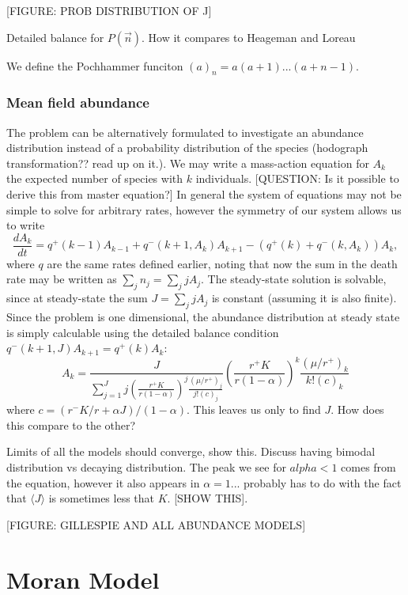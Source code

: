 \documentclass[11pt,a4paper,final]{iopart}
\begin{document}
[FIGURE: PROB DISTRIBUTION OF J]

Detailed balance for $P(\vec{n})$.
How it compares to Heageman and Loreau ~\cite{ref7}

We define the Pochhammer funciton $(a)_n=a(a+1)...(a+n-1)$.

\subsubsection{Mean field abundance}
The problem can be alternatively formulated to investigate an abundance distribution instead of a probability distribution of the species (hodograph transformation?? read up on it.).
We may write a mass-action equation for $A_k$ the expected number of species with $k$ individuals.
[QUESTION: Is it possible to derive this from master equation?]
In general the system of equations may not be simple to solve for arbitrary rates, however the symmetry of our system allows us to write
\begin{equation}
\frac{dA_k}{dt} = q^+(k-1)A_{k-1} + q^-(k+1,{A_k})A_{k+1} - \left( q^+(k) + q^-(k,{A_k}) \right) A_{k},
\end{equation}
where $q$ are the same rates defined earlier, noting that now the sum in the death rate may be written as $\sum_j n_j = \sum_j j A_j$.
The steady-state solution is solvable, since at steady-state the sum $J=\sum_j j A_j$ is constant (assuming it is also finite).
Since the problem is one dimensional, the abundance distribution at steady state is simply calculable using the detailed balance condition $q^-(k+1,J)A_{k+1}=q^+(k)A_k$:
\begin{equation}
A_k = \frac{J}{\sum_{j=1}^J j \left( \frac{r^+ K}{r(1-\alpha)} \right) ^j \frac{ (\mu /r^+)_{j} }{ j!(c)_{j} }} \left( \frac{r^+ K}{r(1-\alpha)} \right) ^k \frac{ (\mu /r^+)_{k} }{ k!(c)_{k} }
\end{equation}
where $c=(r^-K/r+\alpha J)/(1-\alpha)$. 
This leaves us only to find $J$.
How does this compare to the other?

Limits of all the models should converge, show this. Discuss having bimodal distribution vs decaying distribution. The peak we see for $alpha < 1$ comes from the equation, however it also appears in $\alpha = 1$... probably has to do with the fact that $\langle J \rangle $ is sometimes less that $K$. [SHOW THIS]. 

[FIGURE: GILLESPIE AND ALL ABUNDANCE MODELS]

\section{Moran Model}
\end{document}
